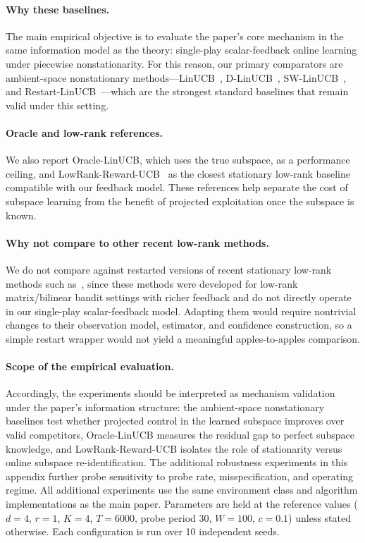 \documentclass{article}
\begin{document}
{\paragraph{Why these baselines.}
The main empirical objective is to evaluate the paper's core mechanism in the same information model as the theory: single-play scalar-feedback online learning under piecewise nonstationarity.
For this reason, our primary comparators are ambient-space nonstationary methods---LinUCB~\citep{abbasi2011improved}, D-LinUCB~\citep{russac2019weighted}, SW-LinUCB~\citep{cheung2019learning}, and Restart-LinUCB~\citep{auer2019adaptively}---which are the strongest standard baselines that remain valid under this setting.

\paragraph{Oracle and low-rank references.}
We also report Oracle-LinUCB, which uses the true subspace, as a performance ceiling, and LowRank-Reward-UCB~\citep{lu2021lowrank} as the closest stationary low-rank baseline compatible with our feedback model.
These references help separate the cost of subspace learning from the benefit of projected exploitation once the subspace is known.

\paragraph{Why not compare to other recent low-rank methods.}
We do not compare against restarted versions of recent stationary low-rank methods such as~\citet{pmlr-v235-jedra24a,pmlr-v235-jang24e}, since these methods were developed for low-rank matrix/bilinear bandit settings with richer feedback and do not directly operate in our single-play scalar-feedback model.
Adapting them would require nontrivial changes to their observation model, estimator, and confidence construction, so a simple restart wrapper would not yield a meaningful apples-to-apples comparison.

\paragraph{Scope of the empirical evaluation.}
Accordingly, the experiments should be interpreted as mechanism validation under the paper's information structure:
the ambient-space nonstationary baselines test whether projected control in the learned subspace improves over valid competitors,
Oracle-LinUCB measures the residual gap to perfect subspace knowledge,
and LowRank-Reward-UCB isolates the role of stationarity versus online subspace re-identification.
The additional robustness experiments in this appendix further probe sensitivity to probe rate, misspecification, and operating regime.
All additional experiments use the same environment class and algorithm implementations as the main paper.
Parameters are held at the reference values ($d{=}4$, $r{=}1$, $K{=}4$, $T{=}6000$, probe period 30, $W{=}100$, $c{=}0.1$) unless stated otherwise.
Each configuration is run over 10 independent seeds.

}
\end{document}
